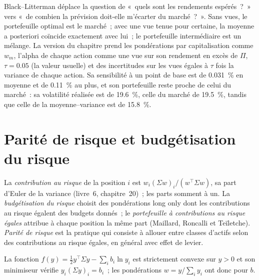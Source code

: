 Black--Litterman déplace la question de «~quels sont les rendements espérés~?~» vers «~de combien la prévision doit-elle m'écarter du marché~?~». Sans vues, le
portefeuille optimal est le marché~; avec une vue tenue pour certaine, la moyenne a posteriori coïncide exactement avec lui~; le portefeuille intermédiaire est un mélange. La version du chapitre prend
les pondérations par capitalisation comme $w_m$, l'alpha de chaque action comme une vue sur son rendement en excès de $\Pi$, $\tau = 0.05$ (la valeur usuelle) et des incertitudes sur les vues égales à
$\tau$ fois la variance de chaque action. Sa sensibilité à un point de base est de 0.031~\% en moyenne et de 0.11~\% au plus, et son portefeuille reste proche de celui du marché~: sa
volatilité réalisée est de 19.6~\%, celle du marché de 19.5~\%, tandis que celle de la moyenne--variance est de 15.8~\%.

\section{Parité de risque et budgétisation du risque}

\begin{definition}\label{def:rs:portfolio-construction-ii:erc}
La \emph{contribution au risque} de la position $i$ est $w_i(\Sigma w)_i/(w^\top\Sigma w)$, sa part d'Euler de la variance (livre~6, chapitre~20)~;
les parts somment à un. La \emph{budgétisation du risque} choisit des pondérations long only dont les contributions au risque égalent des budgets donnés~; le \emph{portefeuille à contributions au risque
égales} attribue à chaque position la même part (Maillard, Roncalli et Teïletche). \emph{Parité de
risque} est la pratique qui consiste à allouer entre classes d'actifs selon des contributions au risque égales, en général avec effet de levier.
\end{definition}

\begin{proposition}\label{prop:rs:portfolio-construction-ii:budget}
La fonction $f(y) = \frac12 y^\top\Sigma y - \sum_i b_i\ln y_i$ est strictement convexe sur $y > 0$ et son minimiseur vérifie $y_i(\Sigma y)_i = b_i$~; les pondérations
$w = y/\sum_i y_i$ ont donc pour  $b$.
\end{proposition}

